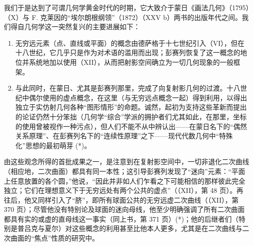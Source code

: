 我们于是达到了可谓几何学黄金时代的时期，它大致介于蒙日《画法几何》（1795）（X）与 F. 克莱因的“埃尔朗根纲领”（1872）（XXV b）两书的出版年代之间。我们得自几何学这一突然复兴的主要进展如下：

\begin{enumerate}
\def\labelenumi{\Alph{enumi})}
\item
  无穷远元素（点、直线或平面）的概念由德萨格于十七世纪引入（VI），但在十八世纪，它几乎只是作为对术语的滥用而出现；彭赛列恢复了这一概念的地位并系统地加以使用（XII），从而把射影空间确立为一切几何现象的一般框架。
\item
  与此同时，在蒙日、尤其是彭赛列那里，完成了向复射影几何的过渡。十八世纪中偶尔使用的虚点概念，在这里（与无穷远点概念一起）得到利用，以得出独立于实仿射几何各种“图形情形”的命题。诚然，起初为支持这些革新而提出的论证仍然十分笨拙（几何学“综合”学派的拥护者们尤其如此，在那里，坐标的使用曾被视作一种污点），但人们不能不从中辨认出——在蒙日名下的“偶然关系原理”、在彭赛列名下的“连续性原理”之下——现代代数几何中“特殊化”思想的最初萌芽 (*)。
\end{enumerate}

由这些观念所得的首批成果之一，是注意到在复射影空间中，一切非退化二次曲线（相应地，二次曲面）都具有同一本性；这引导彭赛列发现了“迷向”元素：“平面上任意放置的各个圆，”他说，“因此并非如人们乍看之下可能相信的那样彼此完全独立；它们在理想意义下于无穷远处有两个公共的虚点”（（XII），第 48 页）。再往后，他又同样引入了“脐”，即所有球面公共的无穷远虚二次曲线（（XII），第 370 页）；尽管他没有特别论及球面的迷向母线，他至少明确强调了所有二次曲面都具有实的或虚的直母线这一事实（同上书，第 371 页）(*)；他的后继者们（特别是普吕克与夏尔）对这些概念的利用甚至比他本人更多，尤其是在二次曲线与二次曲面的“焦点”性质的研究中。

